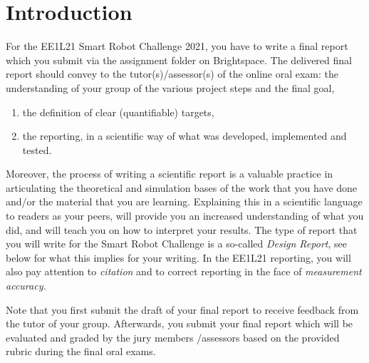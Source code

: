 \chapter{Introduction}

  For the EE1L21 Smart Robot Challenge 2021, you have to write a final report which you submit via the assignment folder on Brightspace. The delivered final report should convey to the tutor(s)/assessor(s) of the online oral exam:
the understanding of your group of the various project steps and the final goal,
\begin{enumerate}
\item  the definition of clear (quantifiable) targets,
\item  the reporting, in a scientific way of what was developed, implemented and tested.
\end{enumerate}

Moreover, the process of writing a scientific report is a valuable practice in articulating the theoretical and simulation bases of the work that you have done and/or the material that you are learning. Explaining this in a scientific language to readers as your peers, will provide you an increased understanding of what you did, and will teach you on how to interpret your results. The type of report that you will write for the Smart Robot Challenge is a so-called \textit{Design Report}, see below for what this implies for your writing. In the EE1L21 reporting, you will also pay attention to \textit{citation }and to correct reporting in the face of \textit{measurement accuracy.}

Note that you first submit the draft of your final report to receive feedback from the tutor of your group. Afterwards, you submit your final report which will be evaluated and graded by the jury members /assessors based on the provided rubric during the final oral exams.

  
